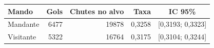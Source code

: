 \begin{tabular}{lrrrc}
  \toprule
  Mando & Gols & Chutes no alvo & Taxa & IC 95\% \\
  \midrule
  Mandante & 6477 & 19878 & 0,3258 & [0,3193; 0,3323] \\
  Visitante & 5322 & 16764 & 0,3175 & [0,3104; 0,3244] \\
  \bottomrule
\end{tabular}
